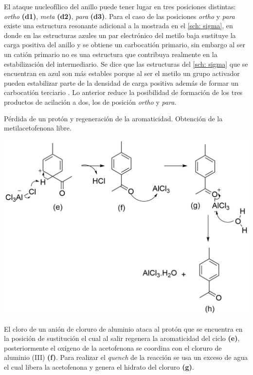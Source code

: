 \documentclass[fleqn,11pt]{SelfArx}
\begin{document}
El ataque nucleofílico del anillo puede tener lugar en tres posiciones distintas: \textit{ortho} \textbf{(d1)}, \textit{meta} \textbf{(d2)}, \textit{para} \textbf{(d3)}. Para el caso de las posiciones \textit{ortho} y \textit{para} existe una estructura resonante adicional a la mostrada en el \autoref{sch: sigma}, en donde en las estructuras azules un par electrónico del metilo baja sustituye la carga positiva del anillo y se obtiene un carbocatión primario, sin embargo al ser un catión primario no es una estructura que contribuya realmente en la estabilización del intermediario. Se dice que las estructuras del \autoref{sch: sigma} que se encuentran en azul son más estables porque al ser el metilo un grupo activador pueden estabilizar parte de la densidad de carga positiva además de formar un carbocatión terciario \cite{Wade2013}. Lo anterior reduce la posibilidad de formación de los tres productos de acilación a dos, los de posición \textit{ortho} y \textit{para}.
\begin{scheme}[h]
	\centering
	\caption{Pérdida de un protón y regeneración de la aromaticidad. Obtención de la metilacetofenona libre.}
	\includegraphics[width=\linewidth]{structures/mechanism2.png}
\end{scheme}

El cloro de un anión de cloruro de aluminio ataca al protón que se encuentra en la posición de sustitución el cual al salir regenera la aromaticidad del ciclo \textbf{(e)}, posteriormente el oxígeno de la acetofenona se coordina con el cloruro de aluminio (III) \textbf{(f)}. Para realizar el \textit{quench} de la reacción se usa un exceso de agua el cual libera la acetofenona y genera el hidrato del cloruro \textbf{(g)}.
\end{document}
